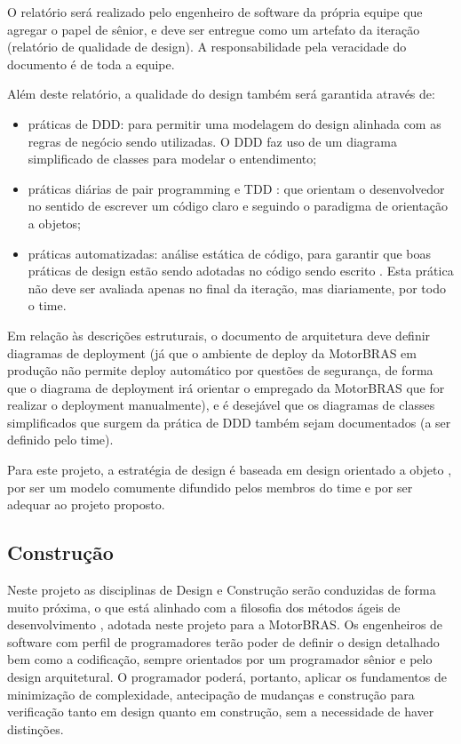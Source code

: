 \documentclass[12pt,journal,compsoc]{IEEEtran}
\begin{document}
O relatório será realizado pelo engenheiro de software da própria equipe que agregar o papel de sênior, e deve ser entregue como um artefato da iteração (relatório de qualidade de design). A responsabilidade pela veracidade do documento é de toda a equipe.

Além deste relatório, a qualidade do design também será garantida através de:
\begin{itemize}
\item práticas de DDD: para permitir uma modelagem do design alinhada com as regras de negócio sendo utilizadas. O DDD faz uso de um diagrama simplificado de classes para modelar o entendimento;
\item práticas diárias de pair programming e TDD \cite{begel_pair_2008}\cite{nagappan_realizing_2008}: que orientam o desenvolvedor no sentido de escrever um código claro e seguindo o paradigma de orientação a objetos;
\item práticas automatizadas: análise estática de código, para garantir que boas práticas de design estão sendo adotadas no código sendo escrito \cite{karpov_static_code_analysis}. Esta prática não deve ser avaliada apenas no final da iteração, mas diariamente, por todo o time.
\end{itemize}

Em relação às descrições estruturais, o documento de arquitetura deve definir diagramas de deployment (já que o ambiente de deploy da MotorBRAS em produção não permite deploy automático por questões de segurança, de forma que o diagrama de deployment irá orientar o empregado da MotorBRAS que for realizar o deployment manualmente), e é desejável que os diagramas de classes simplificados que surgem da prática de DDD também sejam documentados (a ser definido pelo time).

Para este projeto, a estratégia de design é baseada em design orientado a objeto \cite{society_software_2004}, por ser um modelo comumente difundido pelos membros do time e por ser adequar ao projeto proposto.


\subsection{Construção}

Neste projeto as disciplinas de Design e Construção \cite{society_software_2004} serão conduzidas de forma muito próxima, o que está alinhado com a filosofia dos métodos ágeis de desenvolvimento \cite{fowler_design_dead}, adotada neste projeto para a MotorBRAS. Os engenheiros de software com perfil de programadores terão poder de definir o design detalhado bem como a codificação, sempre orientados por um programador sênior e pelo design arquitetural. O programador poderá, portanto, aplicar os fundamentos de minimização de complexidade, antecipação de mudanças e construção para verificação tanto em design quanto em construção, sem a necessidade de haver distinções. %
\end{document}
